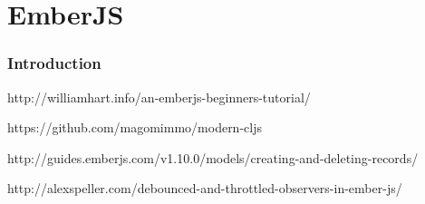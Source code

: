 \documentclass[inzynier,druk,ramka]{tex/dyplom}
\begin{document}
\chapter{EmberJS}

\subsection{Introduction}

\cite{ember2014}

\nocite{*}


\begin{thebibliography}{9}

  http://williamhart.info/an-emberjs-beginners-tutorial/
  
https://github.com/magomimmo/modern-cljs

http://guides.emberjs.com/v1.10.0/models/creating-and-deleting-records/

http://alexspeller.com/debounced-and-throttled-observers-in-ember-js/

\end{thebibliography}
\end{document}
